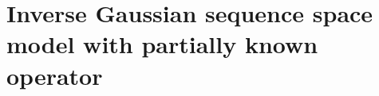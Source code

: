 \section{Inverse Gaussian sequence space model with partially known operator}\label{FREQ_IGSSM_UNKNOWN}